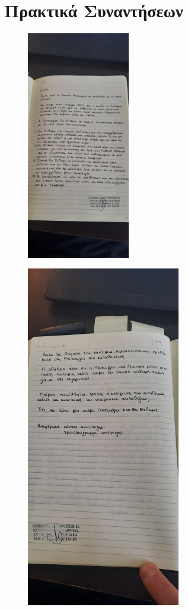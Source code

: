 \section{Πρακτικά Συναντήσεων}
\begin{figure}[H]
	\centering
	\includegraphics[angle=270, width=0.4\textwidth]{Images/p1}
\end{figure}

\begin{figure}[H]
	\centering
	\includegraphics[angle=270, width=0.6\textwidth]{Images/p2}
\end{figure}

